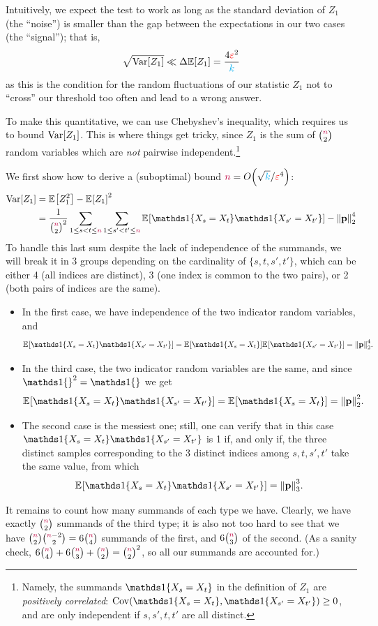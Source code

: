 Intuitively, we expect the test to work as long as the standard deviation of $Z_1$ (the ``noise'') is smaller than the gap between the expectations in our two cases (the ``signal''); that is,
\begin{equation}
  \label{eq:signal:to:noise}
      \sqrt{\Var[Z_1]} \ll \Delta \expect{Z_1} = \frac{4\dst^2}{\ab}
\end{equation}
as this is the condition for the random fluctuations of our statistic $Z_1$ not to ``cross'' our threshold too often and lead to a wrong answer.

To make this quantitative, we can use Chebyshev's inequality, which requires us to bound $\operatorname{Var}[Z_1]$. This is where things get tricky, since $Z_1$ is the sum of $\binom{{\textcolor{purple}{n}}}{2}$ random variables which are \emph{not} pairwise independent.\footnote{Namely, the summands $\indic{X_s=X_t}$ in the definition of $Z_1$ are \emph{positively correlated}: $\cov(\indic{X_s=X_t},\indic{X_{s'}=X_{t'}}) \geq 0$, and are only independent if $s,s',t,t'$ are all distinct.} 

We first show how to derive a (suboptimal) bound $\ns=\bigO{\sqrt{\ab}/\dst^4}$:
\begin{align*}
  \Var[Z_1] 
   &= \bEE{Z_1^2} - \bEE{Z_1}^2\\
   &= \frac{1}{\binom{\ns}{2}^2} \sum_{1\leq s < t \leq \ns}\sum_{1\leq s' < t' \leq \ns} \bEE{\indic{X_s=X_t}\indic{X_{s'}=X_{t'}}} - \normtwo{\p}^4
\end{align*}
To handle this last sum despite the lack of independence of the summands, we will break it in 3 groups depending on the cardinality of $\{s,t,s',t'\}$, which can be either 4 (all indices are distinct), 3 (one index is common to the two pairs), or 2 (both pairs of indices are the same).
\begin{itemize}
  \item In the first case, we have independence of the two indicator random variables, and 
  \[
    \bEE{\indic{X_s=X_t}\indic{X_{s'}=X_{t'}}} = \bEE{\indic{X_s=X_t}}\bEE{\indic{X_{s'}=X_{t'}}} = \normtwo{\p}^4.
  \]
  \item In the third case, the two indicator random variables are the same, and since $\indic{}^2=\indic{}$ we get
  \[
    \bEE{\indic{X_s=X_t}\indic{X_{s'}=X_{t'}}} = \bEE{\indic{X_s=X_t}} = \normtwo{\p}^2.
  \]
  \item The second case is the messiest one; still, one can verify that in this case $\indic{X_s=X_t}\indic{X_{s'}=X_{t'}}$ is 1 if, and only if, the three distinct samples corresponding to the 3 distinct indices among $s,t,s',t'$ take the same value, from which
  \[
    \bEE{\indic{X_s=X_t}\indic{X_{s'}=X_{t'}}} = \norm{\p}_3^3.
  \]
\end{itemize}
It remains to count how many summands of each type we have. Clearly, we have exactly $\binom{{\textcolor{purple}{n}}}{2}$ summands of the third type; it is also not too hard to see that we have $\binom{{\textcolor{purple}{n}}}{2}\binom{{\textcolor{purple}{n}}-2}{2} = 6\binom{{\textcolor{purple}{n}}}{4}$ summands of the first, and $6\binom{{\textcolor{purple}{n}}}{3}$ of the second. (As a sanity check, $6\binom{{\textcolor{purple}{n}}}{4}+6\binom{{\textcolor{purple}{n}}}{3}+\binom{{\textcolor{purple}{n}}}{2} = \binom{{\textcolor{purple}{n}}}{2}^2$, so all our summands are accounted for.)

